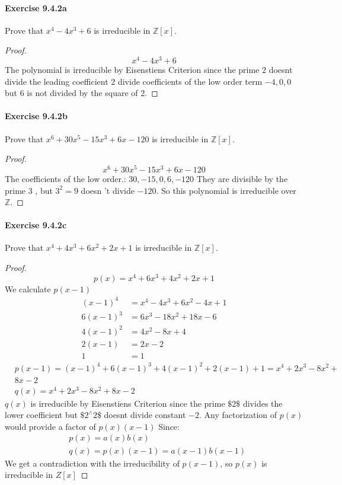 \documentclass{article}
\theoremstyle{definition}
\begin{document}
\paragraph{Exercise 9.4.2a} Prove that $x^4-4x^3+6$ is irreducible in $\mathbb{Z}[x]$.
\begin{proof}
$$
x^4-4 x^3+6
$$
The polynomial is irreducible by Eisenstiens Criterion since the prime $2$ doesnt divide the leading coefficient 2 divide coefficients of the low order term $-4,0,0$ but 6 is not divided by the square of 2.
\end{proof}



\paragraph{Exercise 9.4.2b} Prove that $x^6+30x^5-15x^3 + 6x-120$ is irreducible in $\mathbb{Z}[x]$.
\begin{proof}
    $$
x^6+30 x^5-15 x^3+6 x-120
$$
The coefficients of the low order.: $30,-15,0,6,-120$
They are divisible by the prime 3 , but $3^2=9$ doesn 't divide $-120$. So this polynomial is irreducible over $\mathbb{Z}$. 
\end{proof}



\paragraph{Exercise 9.4.2c} Prove that $x^4+4x^3+6x^2+2x+1$ is irreducible in $\mathbb{Z}[x]$.
\begin{proof}
$$
p(x)=x^4+6 x^3+4 x^2+2 x+1
$$
We calculate $p(x-1)$
$$
\begin{aligned}
(x-1)^4 & =x^4-4 x^3+6 x^2-4 x+1 \\
6(x-1)^3 & =6 x^3-18 x^2+18 x-6 \\
4(x-1)^2 & =4 x^2-8 x+4 \\
2(x-1) & =2 x-2 \\
1 & =1
\end{aligned}
$$
$$
\begin{aligned}
& p(x-1)=(x-1)^4+6(x-1)^3+4(x-1)^2+2(x-1)+1=x^4+2 x^3-8 x^2+ \\
& 8 x-2 \\
& q(x)=x^4+2 x^3-8 x^2+8 x-2
\end{aligned}
$$
$q(x)$ is irreducible by Eisenstiens Criterion since the prime $\$ 2 \$$ divides the lower coefficient but $\$ 2^{\wedge} 2 \$$ doesnt divide constant $-2$. Any factorization of $p(x)$ would provide a factor of $p(x)(x-1)$
Since:
$$
\begin{aligned}
& p(x)=a(x) b(x) \\
& q(x)=p(x)(x-1)=a(x-1) b(x-1)
\end{aligned}
$$
We get a contradiction with the irreducibility of $p(x-1)$, so $p(x)$ is irreducible in $Z[x]$
\end{proof}
\end{document}
